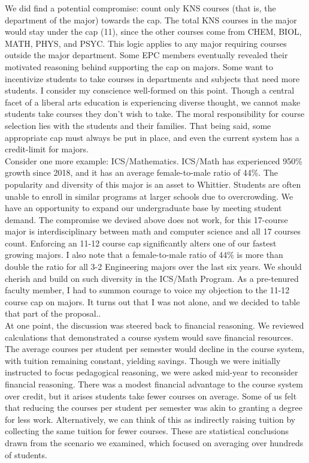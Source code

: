 \documentclass[../../../main.tex]{subfiles}
\begin{document}
We did find a potential compromise: count only KNS courses (that is, the department of the major) towards the cap.  The total KNS courses in the major would stay under the cap (11), since the other courses come from CHEM, BIOL, MATH, PHYS, and PSYC.  This logic applies to any major requiring courses outside the major department.  Some EPC members eventually revealed their motivated reasoning behind supporting the cap on majors.  Some want to incentivize students to take courses in departments and subjects that need more students.  I consider my conscience well-formed on this point.  Though a central facet of a liberal arts education is experiencing diverse thought, we cannot make students take courses they don't wish to take.  The moral responsibility for course selection lies with the students and their families.  That being said, some appropriate cap must always be put in place, and even the current system has a credit-limit for majors.
\\
\vspace{0.15cm}
Consider one more example: ICS/Mathematics.  ICS/Math has experienced 950\% growth since 2018, and it has an average female-to-male ratio of 44\%.  The popularity and diversity of this major is an asset to Whittier.  Students are often unable to enroll in similar programs at larger schools due to overcrowding.  We have an opportunity to expand our undergraduate base by meeting student demand.  The compromise we devised above does not work, for this 17-course major is interdisciplinary between math and computer science and all 17 courses count.  Enforcing an 11-12 course cap significantly alters one of our fastest growing majors.  I also note that a female-to-male ratio of 44\% is more than double the ratio for all 3-2 Engineering majors over the last six years.  We should cherish and build on such diversity in the ICS/Math Program.  As a pre-tenured faculty member, I had to summon courage to voice my objection to the 11-12 course cap on majors.  It turns out that I was not alone, and we decided to table that part of the proposal..
\\
\vspace{0.15cm}
At one point, the discussion was steered back to financial reasoning.  We reviewed calculations that demonstrated a course system would save financial resources.  The average courses per student per semester would decline in the course system, with tuition remaining constant, yielding savings.  Though we were initially instructed to focus pedagogical reasoning, we were asked mid-year to reconsider financial reasoning.  There was a modest financial advantage to the course system over credit, but it arises students take fewer courses on average.  Some of us felt that reducing the courses per student per semester was akin to granting a degree for less work.  Alternatively, we can think of this as indirectly raising tuition by collecting the same tuition for fewer courses.  These are statistical conclusions drawn from the scenario we examined, which focused on averaging over hundreds of students.
\end{document}
